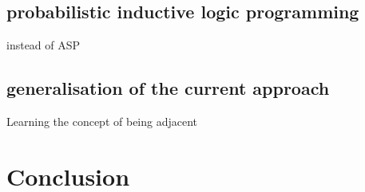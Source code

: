\documentclass[12pt,twoside]{report}
\theoremstyle{plain}
\theoremstyle{definition}
\begin{document}
\subsection{probabilistic inductive logic programming}
instead of ASP

\subsection{generalisation of the current approach}

Learning the concept of being adjacent

\section{Conclusion}
\label{conclusion}


\clearpage
\appendix
\pagebreak
\begin{appendices}





\end{appendices}






\end{document}
